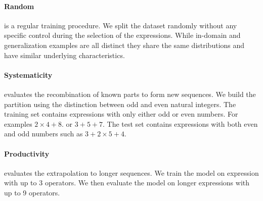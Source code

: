 
\paragraph{Random} is a regular training procedure. We split the dataset randomly without any specific control during the selection of the expressions. While in-domain and generalization examples are all distinct they share the same distributions and have similar underlying characteristics.

\paragraph{Systematicity} evaluates the recombination of known parts to form new sequences. We build the partition using the distinction between odd and even natural integers. The training set contains expressions with only either odd or even numbers. For examples $2 \times 4 + 8$. or $3 + 5 + 7$. The test set contains expressions with both even and odd numbers such as $3 + 2 \times 5 + 4$.

\paragraph{Productivity} evaluates the extrapolation to longer sequences. We train the model on expression with up to 3 operators. We then evaluate the model on longer expressions with up to 9 operators.


